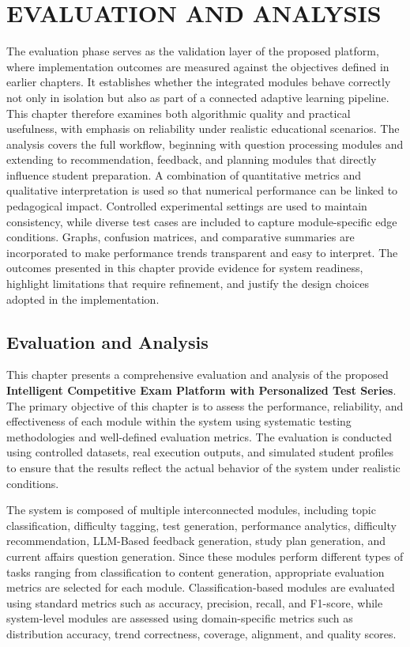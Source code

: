 \chapter{\MakeUppercase{EVALUATION AND ANALYSIS}}
\begin{sloppypar}

The evaluation phase serves as the validation layer of the proposed platform, where implementation outcomes are measured against the objectives defined in earlier chapters. It establishes whether the integrated modules behave correctly not only in isolation but also as part of a connected adaptive learning pipeline. This chapter therefore examines both algorithmic quality and practical usefulness, with emphasis on reliability under realistic educational scenarios. The analysis covers the full workflow, beginning with question processing modules and extending to recommendation, feedback, and planning modules that directly influence student preparation. A combination of quantitative metrics and qualitative interpretation is used so that numerical performance can be linked to pedagogical impact. Controlled experimental settings are used to maintain consistency, while diverse test cases are included to capture module-specific edge conditions. Graphs, confusion matrices, and comparative summaries are incorporated to make performance trends transparent and easy to interpret. The outcomes presented in this chapter provide evidence for system readiness, highlight limitations that require refinement, and justify the design choices adopted in the implementation.

\section{Evaluation and Analysis}

This chapter presents a comprehensive evaluation and analysis of the proposed \textbf{Intelligent Competitive Exam Platform with Personalized Test Series}. The primary objective of this chapter is to assess the performance, reliability, and effectiveness of each module within the system using systematic testing methodologies and well-defined evaluation metrics. The evaluation is conducted using controlled datasets, real execution outputs, and simulated student profiles to ensure that the results reflect the actual behavior of the system under realistic conditions.

The system is composed of multiple interconnected modules, including topic classification, difficulty tagging, test generation, performance analytics, difficulty recommendation, LLM-Based feedback generation, study plan generation, and current affairs question generation. Since these modules perform different types of tasks ranging from classification to content generation, appropriate evaluation metrics are selected for each module. Classification-based modules are evaluated using standard metrics such as accuracy, precision, recall, and F1-score, while system-level modules are assessed using domain-specific metrics such as distribution accuracy, trend correctness, coverage, alignment, and quality scores.


\end{sloppypar}
